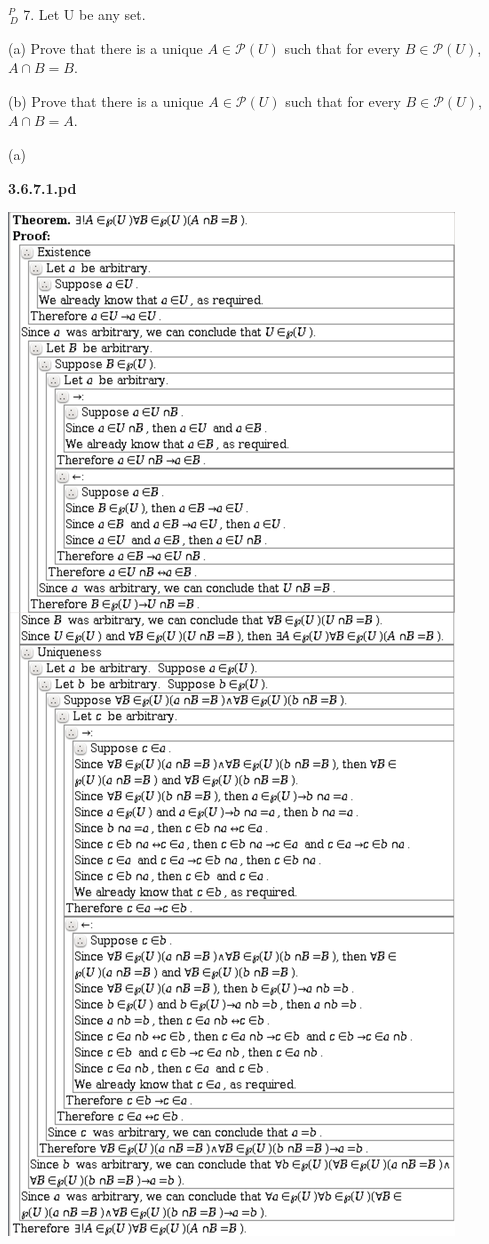 \documentclass{article}
\begin{document}
\vspace{30pt}

$^{\textit{P}}_{\, \textit{D}}$ 7. Let U be any set.

\hspace{12pt}(a) Prove that there is a unique $A \in \mathcal{P} (U)$ such that for every $B \in \mathcal{P} (U)$, $A \cap B = B$.

\hspace{12pt}(b) Prove that there is a unique $A \in \mathcal{P} (U)$ such that for every $B \in
\mathcal{P} (U)$, $A \cap B = A$.

\vspace{30pt}

(a)

\textbf{3.6.7.1.pd}
\vspace{10pt}

\includegraphics[scale=0.12]{3_6_7_1}
\end{document}
